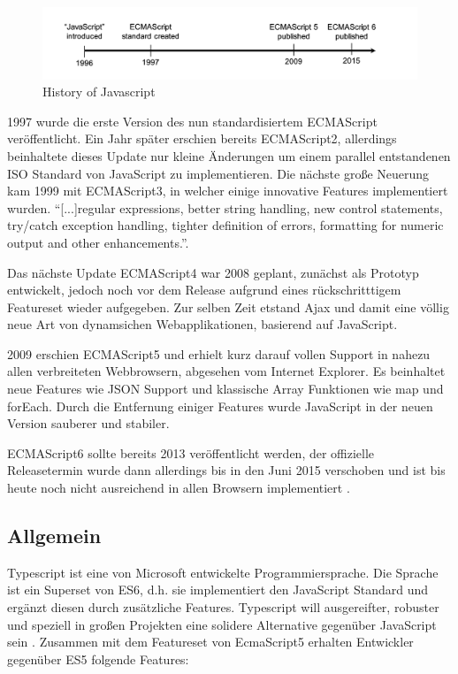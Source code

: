 \begin{figure}[hp]
 \centering
 \includegraphics[width=\linewidth]{kapitel2/javascript-timeline.png}
 \caption{History of Javascript \cite[28]{EssentialTS}}
\end{figure}

1997 wurde die erste Version des nun standardisiertem ECMAScript veröffentlicht. Ein Jahr später erschien bereits ECMAScript2,
allerdings beinhaltete dieses Update nur kleine Änderungen um einem parallel entstandenen ISO Standard von JavaScript zu implementieren.
Die nächste große Neuerung kam 1999 mit ECMAScript3, in welcher einige innovative Features implementiert wurden.
``[...]regular expressions, better string handling, new control statements, try/catch exception handling, tighter definition of errors, formatting for numeric output and other enhancements.''\cite{js-vs-es}.

Das nächste Update ECMAScript4 war 2008 geplant, zunächst als Prototyp entwickelt,
jedoch noch vor dem Release aufgrund eines rückschritttigem Featureset wieder aufgegeben.
Zur selben Zeit etstand Ajax und damit eine völlig neue Art von dynamsichen Webapplikationen,
basierend auf JavaScript.

2009 erschien ECMAScript5 und erhielt kurz darauf vollen Support in nahezu allen verbreiteten Webbrowsern, abgesehen vom Internet Explorer.
Es beinhaltet neue Features wie \ac{JSON} Support und klassische Array Funktionen wie map und forEach.
Durch die Entfernung einiger Features wurde JavaScript in der neuen Version sauberer und stabiler.

ECMAScript6 sollte bereits 2013 veröffentlicht werden, der offizielle Releasetermin wurde
dann allerdings bis in den Juni 2015 verschoben und ist bis heute noch nicht ausreichend in allen Browsern implementiert
\cite{js-vs-es}.

\subsection{Allgemein}

Typescript ist eine von Microsoft entwickelte Programmiersprache.
Die Sprache ist ein Superset von ES6, d.h. sie implementiert den JavaScript Standard und ergänzt diesen
durch zusätzliche Features.
Typescript will ausgereifter, robuster und speziell in großen Projekten eine solidere Alternative gegenüber JavaScript sein \cite[28]{EssentialTS}.
Zusammen mit dem Featureset von EcmaScript5 erhalten Entwickler gegenüber ES5 folgende Features:

